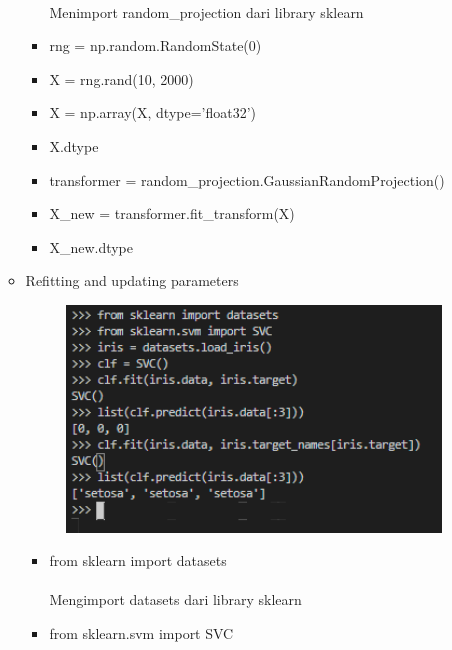 \documentclass{article}
\begin{document}
\begin{enumerate}
\begin{itemize}
\begin{itemize}
                                \paragraph{}Menimport random\_projection dari library sklearn
                            \item rng = np.random.RandomState(0)
                            \item X = rng.rand(10, 2000)
                            \item X = np.array(X, dtype='float32')
                            \item X.dtype
                            \item transformer = random\_projection.GaussianRandomProjection()
                            \item X\_new = transformer.fit\_transform(X)
                            \item X\_new.dtype
                        \end{itemize}
                    \item Refitting and updating parameters 
                        \begin{figure}[ht]
                            \centerline{\includegraphics[width=10cm]{6.PNG}}
                        \end{figure}
                        \begin{itemize}
                            \item from sklearn import datasets
                                \paragraph{}Mengimport datasets dari library sklearn
                            \item from sklearn.svm import SVC

\end{itemize}
\end{itemize}
\end{enumerate}
\end{document}
